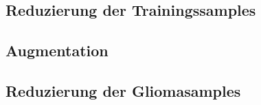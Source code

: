 \subsection{Reduzierung der Trainingssamples}
\subsection{Augmentation}
\subsection{Reduzierung der Gliomasamples}

